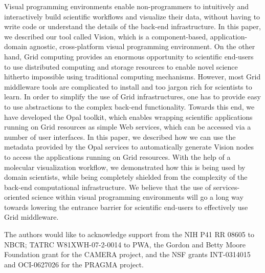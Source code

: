 \documentclass[conference]{IEEEtran}
\begin{document}
Visual programming environments enable non-programmers to intuitively and
interactively build scientific workflows and visualize their data, without
having to write code or understand the details of the back-end
infrastructure. In this paper, we described our tool called Vision, which
is a component-based, application-domain agnostic, cross-platform visual
programming environment. On the other hand, Grid computing provides an
enormous opportunity to scientific end-users to use distributed computing
and storage resources to enable novel science hitherto impossible using
traditional computing mechanisms. However, most Grid middleware tools are
complicated to install and too jargon rich for scientists to learn. In
order to simplify the use of Grid infrastructures, one has to provide easy
to use abstractions to the complex back-end functionality. Towards this
end, we have developed the Opal toolkit, which enables wrapping scientific
applications running on Grid resources as simple Web services, which can be
accessed via a number of user interfaces. In this paper, we described how
we can use the metadata provided by the Opal services to automatically
generate Vision nodes to access the applications running on Grid resources.
With the help of a molecular visualization workflow, we demonstrated how
this is being used by domain scientists, while being completely shielded
from the complexity of the back-end computational infrastructure. We
believe that the use of services-oriented science within visual programming
environments will go a long way towards lowering the entrance barrier for
scientific end-users to effectively use Grid middleware.

The authors would like to acknowledge support from the NIH P41 RR 08605 to
NBCR; TATRC W81XWH-07-2-0014 to PWA, the Gordon and Betty Moore Foundation
grant for the CAMERA project, and the NSF grants INT-0314015 and
OCI-0627026 for the PRAGMA project. 




\end{document}
